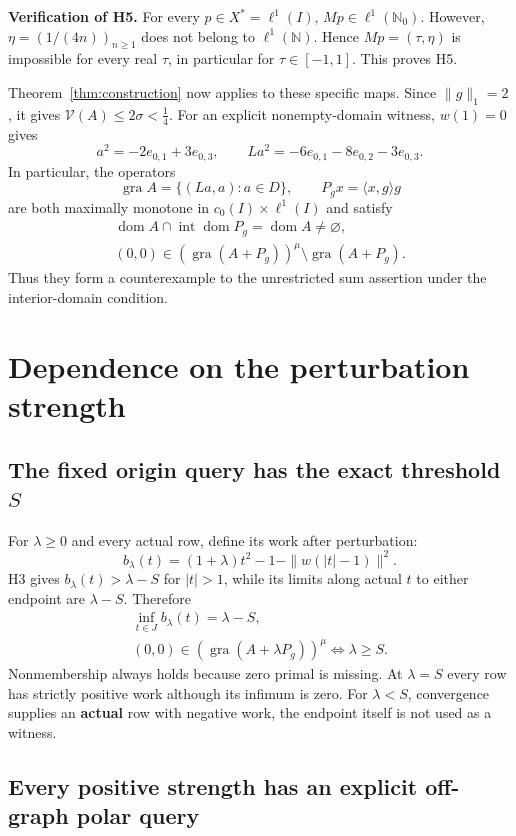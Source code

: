 \documentclass[11pt,a4paper]{article}
\begin{document}
\textbf{Verification of H5.} For every $p\in X^*=\ell^1(I)$, $Mp\in\ell^1(\mathbb N_0)$. However, $\eta=(1/(4n))_{n\ge1}$ does not belong to $\ell^1(\mathbb N)$. Hence $Mp=(\tau,\eta)$ is impossible for every real $\tau$, in particular for $\tau\in[-1,1]$. This proves H5.

Theorem~\ref{thm:construction} now applies to these specific maps. Since $\|g\|_1=2$, it gives $\mathcal V(A)\le2\sigma<\frac14$. For an explicit nonempty-domain witness, $w(1)=0$ gives
\[
a^2=-2e_{0,1}+3e_{0,3},\qquad
La^2=-6e_{0,1}-8e_{0,2}-3e_{0,3}.
\]
In particular, the operators
\[
\operatorname{gra}A=\{(La,a):a\in D\},\qquad
P_gx=\langle x,g\rangle g
\]
are both maximally monotone in $c_0(I)\times\ell^1(I)$ and satisfy
\[
\begin{gathered}
\operatorname{dom}A\cap\operatorname{int}\operatorname{dom}P_g
=\operatorname{dom}A\ne\varnothing,\\
(0,0)\in(\operatorname{gra}(A+P_g))^\mu
\setminus\operatorname{gra}(A+P_g).
\end{gathered}
\tag{C5}
\]
Thus they form a counterexample to the unrestricted sum assertion under the interior-domain condition.

\section{Dependence on the perturbation strength}

\subsection{The fixed origin query has the exact threshold $S$}

For $\lambda\ge0$ and every actual row, define its work after perturbation:
\[
b_\lambda(t)=(1+\lambda)t^2-1-\|w(|t|-1)\|^2.
\tag{S1}
\]
H3 gives $b_\lambda(t)>\lambda-S$ for $|t|>1$, while its limits along actual $t$ to either endpoint are $\lambda-S$. Therefore
\[
\begin{gathered}
\inf_{t\in J}b_\lambda(t)=\lambda-S,\\
(0,0)\in(\operatorname{gra}(A+\lambda P_g))^\mu
\iff\lambda\ge S.
\end{gathered}
\tag{S2}
\]
Nonmembership always holds because zero primal is missing. At $\lambda=S$ every row has strictly positive work although its infimum is zero. For $\lambda<S$, convergence supplies an \textbf{actual} row with negative work, the endpoint itself is not used as a witness.

\subsection{Every positive strength has an explicit off-graph polar query}
\end{document}
